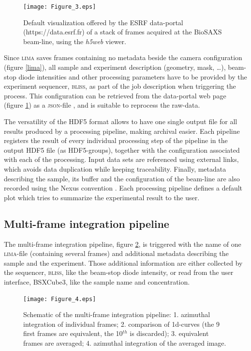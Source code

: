 \documentclass[preprint]{iucr}              %
\begin{document}
\begin{figure}
     \caption{Default visualization offered by the ESRF data-portal (https://data.esrf.fr) of a stack of frames acquired at the BioSAXS beam-line, using the \textit{h5web} viewer.}
     \texttt{[image: Figure\_3.eps]}
     \label{dataportal}
\end{figure}

Since \textsc{lima} saves frames containing no metadata beside the camera configuration (figure \ref{lima}), all sample and experiment description (geometry, mask, \ldots), beam-stop diode intensities and other processing parameters have to be provided by the experiment sequencer, \textsc{bliss}, as part of the job description when triggering the process. 
This configuration can be retrieved from the data-portal web page (figure \ref{dataportal}) as a \textsc{json}-file \cite{json}, and is suitable to reprocess the raw-data.

The versatility of the HDF5 format allows to have one single output file for all results produced by a processing pipeline, making archival easier.
Each pipeline registers the result of every individual processing step of the pipeline in the output HDF5 file (as HDF5-groups), together with the configuration associated with each of the processing.
Input data sets are referenced using external links, which avoids data duplication while keeping traceability. 
Finally, metadata describing the sample, its buffer and the configuration of the beam-line are also recorded using the Nexus convention \cite{nexus}.
Each processing pipeline defines a default plot which tries to summarize the experimental result to the user.

\subsection{Multi-frame integration pipeline}
\label{multiframe_pipeline}
The multi-frame integration pipeline, figure \ref{multiframe_worflow}, is triggered with the name of one \textsc{lima}-file (containing several frames) and additional metadata describing the sample and the experiment.
Those additional information are either collected by the sequencer, \textsc{bliss}, like the beam-stop diode intensity, or read from the user interface, BSXCube3, like the sample name and concentration.

\begin{figure}
     \label{multiframe_worflow}
     \begin{center} 
     \caption{Schematic of the multi-frame integration pipeline: 
     1. azimuthal integration of individual frames; 
     2. comparison of 1d-curves (the 9 first frames are equivalent, the 10$^{th}$ is discarded);
     3. equivalent frames are averaged;
     4. azimuthal integration of the averaged image.}
     \texttt{[image: Figure\_4.eps]}
     \end{center}
\end{figure}
\end{document}

